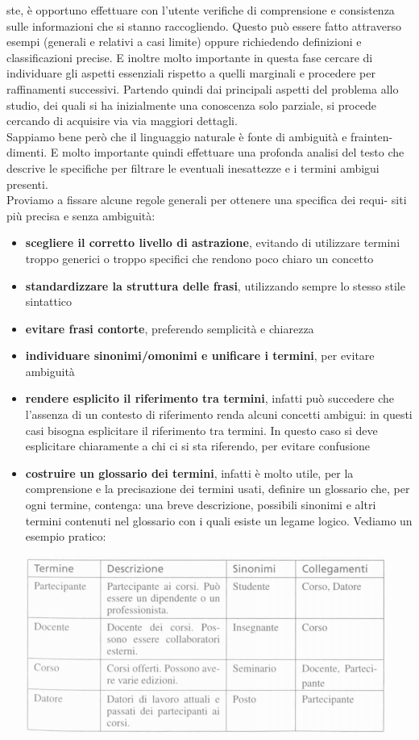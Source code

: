 \documentclass[a4paper,12pt, oneside]{book}
\begin{document}
ste, è opportuno effettuare con l'utente verifiche di comprensione e consistenza
sulle informazioni che si stanno raccogliendo. Questo può essere fatto attraverso
esempi (generali e relativi a casi limite) oppure richiedendo definizioni e classificazioni precise. E inoltre molto importante in questa fase cercare di individuare
gli aspetti essenziali rispetto a quelli marginali e procedere per raffinamenti successivi. Partendo quindi dai principali aspetti del problema allo studio, dei quali
si ha inizialmente una conoscenza solo parziale, si procede cercando di acquisire
via via maggiori dettagli.\\
Sappiamo bene però che il linguaggio naturale è fonte di ambiguità e frainten-
dimenti. E molto importante quindi effettuare una profonda analisi del testo che
descrive le specifiche per filtrare le eventuali inesattezze e i termini ambigui presenti.\\
Proviamo a fissare alcune regole generali per ottenere una specifica dei requi-
siti più precisa e senza ambiguità:
\begin{itemize}
\item \textbf{scegliere il corretto livello di astrazione}, evitando di utilizzare termini
  troppo generici o troppo specifici che rendono poco chiaro un concetto
\item \textbf{standardizzare la struttura delle frasi}, utilizzando sempre lo stesso stile sintattico
\item \textbf{evitare frasi contorte}, preferendo semplicità e chiarezza
\item \textbf{individuare sinonimi/omonimi e unificare i termini}, per evitare ambiguità
\item \textbf{rendere esplicito il riferimento tra termini}, infatti può
  succedere che l'assenza di un contesto di riferimento renda alcuni concetti
  ambigui: in questi casi bisogna esplicitare il riferimento tra termini.
  In questo caso si deve esplicitare chiaramente a chi ci si sta riferendo,
  per evitare confusione
  \newpage
\item \textbf{costruire un glossario dei termini}, infatti è molto utile, per la comprensione e la
  precisazione dei termini usati, definire un glossario che, per ogni termine,
  contenga: una breve descrizione, possibili sinonimi e altri termini contenuti nel
  glossario con i quali esiste un legame logico. Vediamo un esempio pratico:
  \begin{center}
    \includegraphics[scale=0.7]{img/glo.png}
  \end{center}
\end{itemize}
\end{document}
